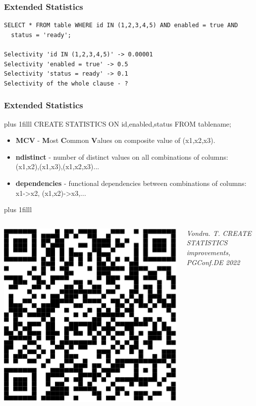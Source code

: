\documentclass{beamer}
\begin{document}
\begin{frame}[fragile]\frametitle{Extended Statistics}
\begin{lstlisting}
SELECT * FROM table WHERE id IN (1,2,3,4,5) AND enabled = true AND
  status = 'ready';

Selectivity 'id IN (1,2,3,4,5)' -> 0.00001
Selectivity 'enabled = true' -> 0.5
Selectivity 'status = ready' -> 0.1
Selectivity of the whole clause - ?
\end{lstlisting}
\end{frame}

\begin{frame}[fragile]\frametitle{Extended Statistics}
\vskip0pt plus 1filll
CREATE STATISTICS ON id,enabled,status FROM tablename;
\vspace{10pt}
\begin{itemize}
  \item \textbf{MCV} - \textbf{M}ost \textbf{C}ommon \textbf{V}alues on composite value  of (x1,x2,x3).
  \item \textbf{ndistinct} - number of distinct values on all combinations of columns: (x1,x2),(x1,x3),(x1,x2,x3)...
  \item \textbf{dependencies} - functional dependencies between combinations of columns: x1->x2, (x1,x2)->x3,...
\end{itemize}
\vskip0pt plus 1filll
\begin{columns}\begin{column}{0.03\textwidth}
\includegraphics[scale=0.1]{pics/vondra_extstat}
\end{column}\begin{column}{0.8\textwidth}
\textit{Vondra. T. CREATE STATISTICS improvements,\\ PGConf.DE 2022}
\end{column}\end{columns}
\end{frame}
\end{document}
